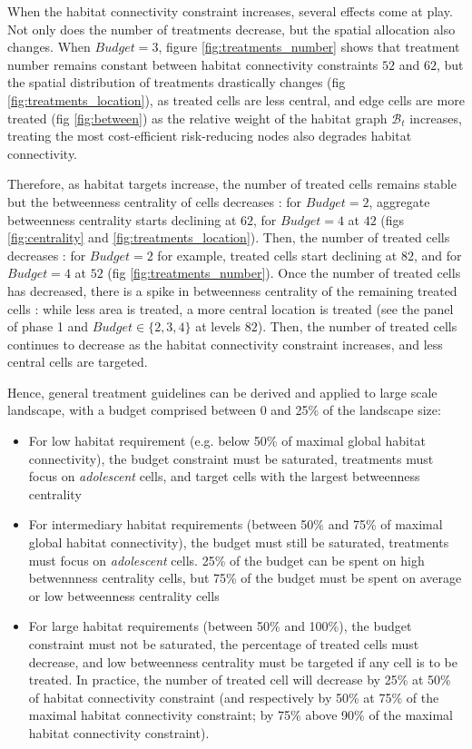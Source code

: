 When the habitat connectivity constraint increases, several effects come at play. Not only does the number of treatments decrease, but the spatial allocation also changes. When $Budget=3$, figure \ref{fig:treatments_number} shows that treatment number remains constant between habitat connectivity constraints $52$ and $62$, but the spatial distribution of treatments drastically changes (fig \ref{fig:treatments_location}), as treated cells are less central, and edge cells are more treated (fig \ref{fig:between}) as the relative weight of the habitat graph $\mathcal{B}_t$ increases, treating the most cost-efficient risk-reducing nodes also degrades habitat connectivity.

Therefore, as habitat targets increase, the number of treated cells remains stable but the betweenness centrality of cells decreases : for $Budget=2$, aggregate betweenness centrality starts declining at $62$, for $Budget=4$ at $42$ (figs \ref{fig:centrality} and \ref{fig:treatments_location}). Then, the number of treated cells decreases : for $Budget=2$ for example, treated cells start declining at $82$, and for $Budget=4$ at $52$ (fig \ref{fig:treatments_number}). Once the number of treated cells has decreased, there is a spike in betweenness centrality of the remaining treated cells : while less area is treated, a more central location is treated (see the panel of phase 1 and $Budget \in \{2,3,4\}$ at levels $82$). Then, the number of treated cells continues to decrease as the habitat connectivity constraint increases, and less central cells are targeted. 

Hence, general treatment guidelines can be derived and applied to large scale landscape, with a budget comprised between 0 and 25\% of the landscape size: 
\begin{itemize}
\item For low habitat requirement (e.g. below 50\% of maximal global habitat connectivity), the budget constraint must be saturated, treatments must focus on \textit{adolescent} cells, and target cells with the largest betweenness centrality
\item For intermediary habitat requirements (between 50\% and 75\% of maximal global habitat connectivity), the budget must still be saturated, treatments must focus on \textit{adolescent} cells. 25\% of the budget can be spent on high betwennness centrality cells, but 75\% of the budget must be spent on average or low betweenness centrality cells
\item For large habitat requirements (between 50\% and 100\%), the budget constraint must not be saturated, the percentage of treated cells must decrease, and low betweenness centrality must be targeted if any cell is to be treated. In practice, the number of treated cell will decrease by 25\% at 50\% of habitat connectivity constraint (and respectively by 50\% at 75\% of the maximal habitat connectivity constraint; by 75\% above 90\% of the maximal habitat connectivity constraint). 
\end{itemize}

